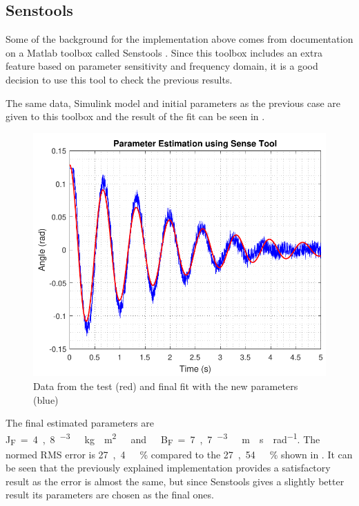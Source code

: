 \subsection{Senstools}
Some of the background for the implementation above comes from documentation on a Matlab toolbox called Senstools \cite{Senstools}. Since this toolbox includes an extra feature based on parameter sensitivity and frequency domain, it is a good decision to use this tool to check the previous results.

The same data, Simulink model and initial parameters as the previous case are given to this toolbox and the result of the fit can be seen in . 
%
\begin{figure}[H]
	\centering
	\includegraphics[scale=0.6]{figures/SenseToolParameterEstimation}
	\caption{Data from the test (red) and final fit with the new parameters (blue)}
	\label{SenseToolParameterEstimation}
\end{figure}

The final estimated parameters are \si{J_F=4,8 ^{-3}\ kg \cdot m^2\ and\ B_F=7,7 ^{-3}\ m \cdot s \cdot rad^{-1}}. The normed RMS error is \si{27,4\ \%} compared to the \si{27,54\ \%} shown in . It can be seen that the previously explained implementation provides a satisfactory result as the error is almost the same, but since Senstools gives a slightly better result its parameters are chosen as the final ones.

